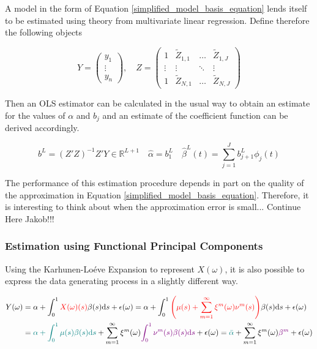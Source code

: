 \documentclass[11pt,twoside,a4paper]{article}
\begin{document}
	A model in the form of Equation \ref{simplified_model_basis_equation} lends itself to be estimated using theory from multivariate linear regression. Define therefore the following objects
	
	\begin{equation}
		Y = \begin{pmatrix}
			y_1 \\ \vdots \\ y_n
		\end{pmatrix}, \quad
		Z = \begin{pmatrix}
			1 & \tilde{Z}_{1,1} & \dots & \tilde{Z}_{1,J} \\
			\vdots & \vdots & \ddots & \vdots \\
			1 & \tilde{Z}_{N,1} & \dots & \tilde{Z}_{N,J}
		\end{pmatrix}
	\end{equation}
	
	Then an OLS estimator can be calculated in the usual way to obtain an estimate for the values of $\alpha$ and $b_j$ and an estimate of the coefficient function can be derived accordingly.
	
	\begin{equation}
		b^L = \left(Z'Z\right)^{-1}Z'Y \in \mathbb{R}^{L+1} \quad \hat{\alpha} = b_{1}^{L} \quad \hat{\beta}^L(t) = \sum_{j = 1}^{J} b_{j+1}^L \phi_j(t)
	\end{equation}

	The performance of this estimation procedure depends in part on the quality of the approximation in Equation \ref{simplified_model_basis_equation}. Therefore, it is interesting to think about when the approximation error is small... {\color{red}Continue Here Jakob!!!}
	
	\subsubsection{Estimation using Functional Principal Components}
	
	Using the Karhunen-Lo\'{e}ve Expansion to represent $X(\omega)$, it is also possible to express the data generating process in a slightly different way.
	
	\begin{equation}
		\begin{split}
			Y(\omega) &= \alpha + \int_{0}^{1} {\color{red}X(\omega)(s)} \beta(s) \mathrm{d}s + \epsilon(\omega)
			= \alpha + \int_{0}^{1} {\color{red}\left(\mu(s) + \sum_{m = 1}^{\infty} \xi^m(\omega) \nu^m(s)\right)} \beta(s) \mathrm{d}s + \epsilon(\omega)\\
			&= {\color{teal}\alpha + \int_{0}^{1} \mu(s) \beta(s) \mathrm{d}s} + \sum_{m = 1}^{\infty} \xi^m(\omega) {\color{violet}\int_{0}^{1} \nu^m(s) \beta(s) \mathrm{d}s} + \epsilon(\omega)
			= {\color{teal}\bar{\alpha}} + \sum_{m = 1}^{\infty} \xi^m(\omega) {\color{violet}\beta^m} + \epsilon(\omega)
		\end{split}
	\end{equation}
\end{document}
